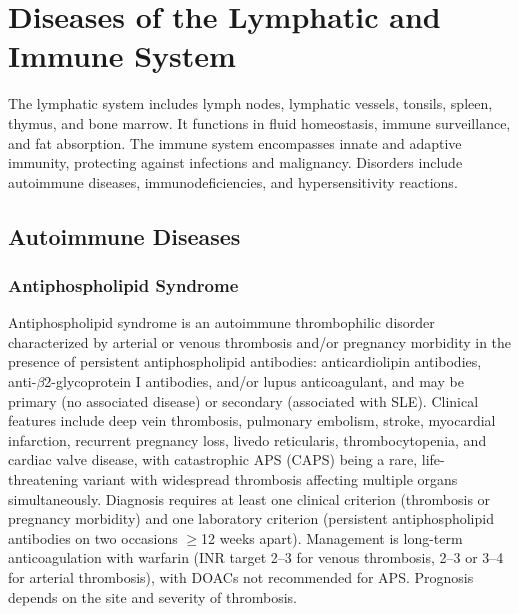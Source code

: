 \chapter{Diseases of the Lymphatic and Immune System}
\label{ch:lymph}
The lymphatic system includes lymph nodes, lymphatic vessels, tonsils, spleen, thymus, and bone marrow. It functions in fluid homeostasis, immune surveillance, and fat absorption. The immune system encompasses innate and adaptive immunity, protecting against infections and malignancy. Disorders include autoimmune diseases, immunodeficiencies, and hypersensitivity reactions.

\section{Autoimmune Diseases}








\label{sec:Autoimmune Diseases}

\subsection{Antiphospholipid Syndrome}
\label{sec:Antiphospholipid Syndrome}
Antiphospholipid syndrome is an autoimmune thrombophilic disorder characterized by arterial or venous thrombosis and/or pregnancy morbidity in the presence of persistent antiphospholipid antibodies: anticardiolipin antibodies, anti-$\beta$2-glycoprotein I antibodies, and/or lupus anticoagulant, and may be primary (no associated disease) or secondary (associated with SLE). Clinical features include deep vein thrombosis, pulmonary embolism, stroke, myocardial infarction, recurrent pregnancy loss, livedo reticularis, thrombocytopenia, and cardiac valve disease, with catastrophic APS (CAPS) being a rare, life-threatening variant with widespread thrombosis affecting multiple organs simultaneously. Diagnosis requires at least one clinical criterion (thrombosis or pregnancy morbidity) and one laboratory criterion (persistent antiphospholipid antibodies on two occasions $\geq$12 weeks apart). Management is long-term anticoagulation with warfarin (INR target 2--3 for venous thrombosis, 2--3 or 3--4 for arterial thrombosis), with DOACs not recommended for APS. Prognosis depends on the site and severity of thrombosis.


